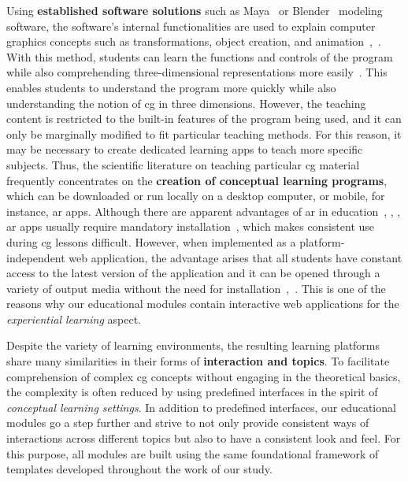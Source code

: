 Using \textbf{established software solutions} such as Maya~\cite{maya:2024:software} or Blender~\cite{blender:2024:documentation} modeling software, the software's internal functionalities are used to explain computer graphics concepts such as transformations, object creation, and animation~\cite{Elyan:2012:cg-tool},~\cite{Kadam:2013:cg-tool}. With this method, students can learn the functions and controls of the program while also comprehending three-dimensional representations more easily~\cite{Kadam:2013:cg-tool}. This enables students to understand the program more quickly while also understanding the notion of \acrshort{cg} in three dimensions. However, the teaching content is restricted to the built-in features of the program being used, and it can only be marginally modified to fit particular teaching methods. For this reason, it may be necessary to create dedicated learning apps to teach more specific subjects. Thus, the scientific literature on teaching particular \acrshort{cg} material frequently concentrates on the \textbf{creation of conceptual learning programs}, which can be downloaded or run locally on a desktop computer, or mobile, for instance, \acrfull{ar} apps.
Although there are apparent advantages of \acrshort{ar} in education~\cite{wu:2013:current}, \cite{lilligreen:2019:AWI}, \cite{lilligreen:2019:EuroVR}, \acrshort{ar} apps usually require mandatory installation~\cite{Qiao:2019:disadvantage-of-ar}, which makes consistent use during \acrshort{cg} lessons difficult. However, when implemented as a platform-independent web application, the advantage arises that all students have constant access to the latest version of the application and it can be opened through a variety of output media without the need for installation~\cite{Eisemann:2023:cg-tool},~\cite{angel:2017:interactive}.  This is one of the reasons why our educational modules contain interactive web applications for the \emph {experiential learning} aspect.


Despite the variety of learning environments, the resulting learning platforms share many similarities in their forms of \textbf{interaction and topics}. To facilitate comprehension of complex \acrshort{cg} concepts without engaging in the theoretical basics, the complexity is often reduced by using predefined interfaces in the spirit of \emph{conceptual learning settings}. In addition to predefined interfaces, our educational modules go a step further and strive to not only provide consistent ways of interactions across different topics but also to have a consistent look and feel. For this purpose, all modules are built using the same foundational framework of templates developed throughout the work of our study.

